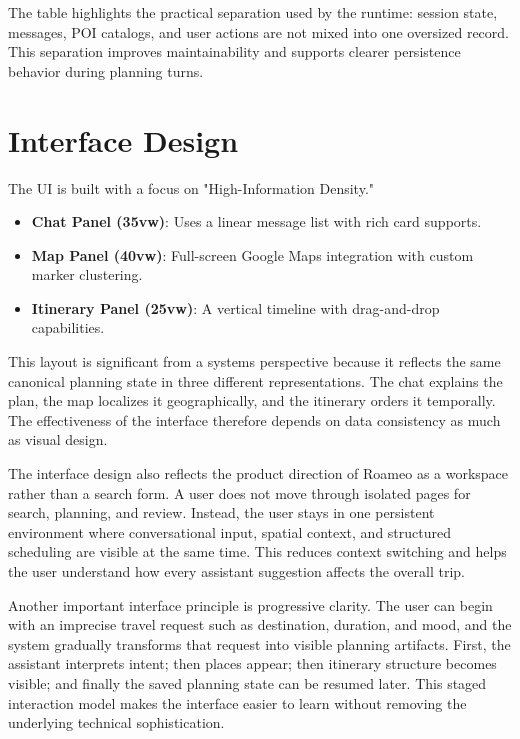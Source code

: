\documentclass[12pt,a4paper]{report}
\begin{document}
\noindent\small The table highlights the practical separation used by the runtime: session state, messages, POI catalogs, and user actions are not mixed into one oversized record. This separation improves maintainability and supports clearer persistence behavior during planning turns.

\section{Interface Design}

The UI is built with a focus on "High-Information Density."

\begin{itemize}[nosep]
    \item \textbf{Chat Panel (35vw)}: Uses a linear message list with rich card supports.
    \item \textbf{Map Panel (40vw)}: Full-screen Google Maps integration with custom marker clustering.
    \item \textbf{Itinerary Panel (25vw)}: A vertical timeline with drag-and-drop capabilities.
\end{itemize}

This layout is significant from a systems perspective because it reflects the same canonical planning state in three different representations. The chat explains the plan, the map localizes it geographically, and the itinerary orders it temporally. The effectiveness of the interface therefore depends on data consistency as much as visual design.

The interface design also reflects the product direction of Roameo as a workspace rather than a search form. A user does not move through isolated pages for search, planning, and review. Instead, the user stays in one persistent environment where conversational input, spatial context, and structured scheduling are visible at the same time. This reduces context switching and helps the user understand how every assistant suggestion affects the overall trip.

Another important interface principle is progressive clarity. The user can begin with an imprecise travel request such as destination, duration, and mood, and the system gradually transforms that request into visible planning artifacts. First, the assistant interprets intent; then places appear; then itinerary structure becomes visible; and finally the saved planning state can be resumed later. This staged interaction model makes the interface easier to learn without removing the underlying technical sophistication.
\end{document}
